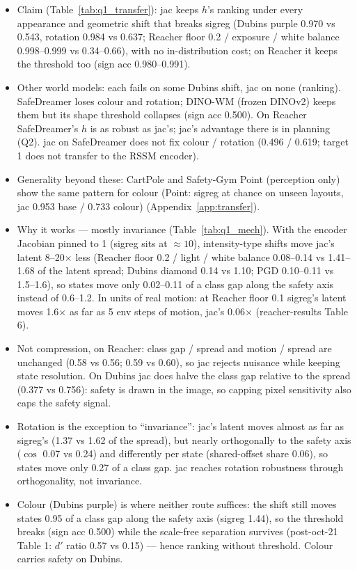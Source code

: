 \documentclass{article}
\begin{document}
\begin{itemize}
  \item Claim (Table~\ref{tab:q1_transfer}): jac keeps $h$'s ranking under every appearance and geometric shift that breaks sigreg (Dubins purple 0.970 vs 0.543, rotation 0.984 vs 0.637; Reacher floor 0.2 / exposure / white balance 0.998--0.999 vs 0.34--0.66), with no in-distribution cost; on Reacher it keeps the threshold too (sign acc 0.980--0.991).
  \item Other world models: each fails on some Dubins shift, jac on none (ranking). SafeDreamer loses colour and rotation; DINO-WM (frozen DINOv2) keeps them but its shape threshold collapses (sign acc 0.500). On Reacher SafeDreamer's $h$ is as robust as jac's; jac's advantage there is in planning (Q2). jac on SafeDreamer does not fix colour / rotation (0.496 / 0.619; target 1 does not transfer to the RSSM encoder).
  \item Generality beyond these: CartPole and Safety-Gym Point (perception only) show the same pattern for colour (Point: sigreg at chance on unseen layouts, jac 0.953 base / 0.733 colour) (Appendix~\ref{app:transfer}).
  \item Why it works --- mostly invariance (Table~\ref{tab:q1_mech}). With the encoder Jacobian pinned to 1 (sigreg sits at $\approx 10$), intensity-type shifts move jac's latent 8--20$\times$ less (Reacher floor 0.2 / light / white balance 0.08--0.14 vs 1.41--1.68 of the latent spread; Dubins diamond 0.14 vs 1.10; PGD 0.10--0.11 vs 1.5--1.6), so states move only 0.02--0.11 of a class gap along the safety axis instead of 0.6--1.2. In units of real motion: at Reacher floor 0.1 sigreg's latent moves 1.6$\times$ as far as 5 env steps of motion, jac's 0.06$\times$ (reacher-results Table 6).
  \item Not compression, on Reacher: class gap / spread and motion / spread are unchanged (0.58 vs 0.56; 0.59 vs 0.60), so jac rejects nuisance while keeping state resolution. On Dubins jac does halve the class gap relative to the spread (0.377 vs 0.756): safety is drawn in the image, so capping pixel sensitivity also caps the safety signal.
  \item Rotation is the exception to ``invariance'': jac's latent moves almost as far as sigreg's (1.37 vs 1.62 of the spread), but nearly orthogonally to the safety axis ($\cos$ 0.07 vs 0.24) and differently per state (shared-offset share 0.06), so states move only 0.27 of a class gap. jac reaches rotation robustness through orthogonality, not invariance.
  \item Colour (Dubins purple) is where neither route suffices: the shift still moves states 0.95 of a class gap along the safety axis (sigreg 1.44), so the threshold breaks (sign acc 0.500) while the scale-free separation survives (post-oct-21 Table 1: $d'$ ratio 0.57 vs 0.15) --- hence ranking without threshold. Colour carries safety on Dubins.

\end{itemize}
\end{document}
